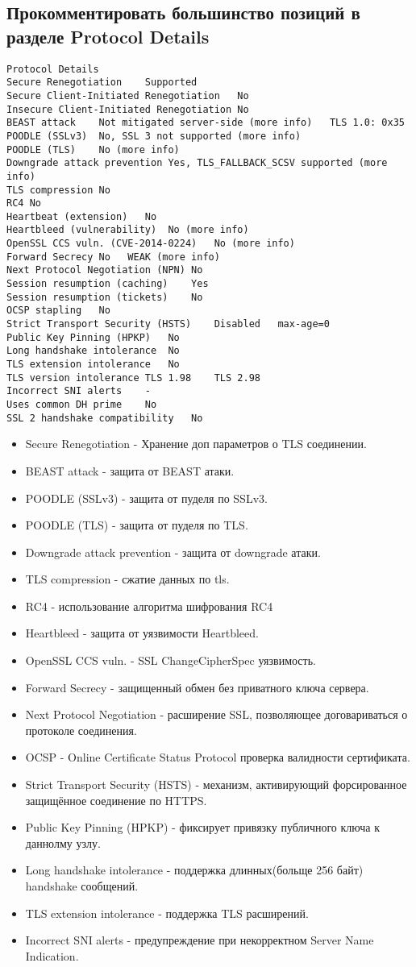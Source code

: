 \documentclass[12pt,a4paper]{article}
\begin{document}
\subsection{Прокомментировать большинство позиций в разделе Protocol Details}
\begin{verbatim}
Protocol Details
Secure Renegotiation	Supported
Secure Client-Initiated Renegotiation	No
Insecure Client-Initiated Renegotiation	No
BEAST attack	Not mitigated server-side (more info)   TLS 1.0: 0x35
POODLE (SSLv3)	No, SSL 3 not supported (more info)
POODLE (TLS)	No (more info)
Downgrade attack prevention	Yes, TLS_FALLBACK_SCSV supported (more info)
TLS compression	No
RC4	No
Heartbeat (extension)	No
Heartbleed (vulnerability)	No (more info)
OpenSSL CCS vuln. (CVE-2014-0224)	No (more info)
Forward Secrecy	No   WEAK (more info)
Next Protocol Negotiation (NPN)	No
Session resumption (caching)	Yes
Session resumption (tickets)	No
OCSP stapling	No
Strict Transport Security (HSTS)	Disabled   max-age=0
Public Key Pinning (HPKP)	No
Long handshake intolerance	No
TLS extension intolerance	No
TLS version intolerance	TLS 1.98 	TLS 2.98 
Incorrect SNI alerts	-
Uses common DH prime	No
SSL 2 handshake compatibility	No
\end{verbatim}
\begin{itemize}
\item Secure Renegotiation - Хранение доп параметров о TLS соединении.
\item BEAST attack - защита от BEAST атаки.
\item POODLE (SSLv3) - защита от пуделя по SSLv3.
\item POODLE (TLS) - защита от пуделя по TLS.
\item Downgrade attack prevention - защита от downgrade атаки.
\item TLS compression - сжатие данных по tls.
\item RC4 - использование алгоритма шифрования RC4
\item Heartbleed - защита от уязвимости Heartbleed.
\item OpenSSL CCS vuln. - SSL ChangeCipherSpec уязвимость.
\item Forward Secrecy - защищенный обмен без приватного ключа сервера.
\item Next Protocol Negotiation - расширение SSL, позволяющее договариваться о протоколе соединения.
\item OCSP - Online Certificate Status Protocol проверка валидности сертификата.
\item Strict Transport Security (HSTS) - механизм, активирующий форсированное защищённое соединение по HTTPS.
\item Public Key Pinning (HPKP) - фиксирует привязку публичного ключа к даннолму узлу.
\item Long handshake intolerance - поддержка длинных(больще 256 байт) handshake сообщений.
\item TLS extension intolerance - поддержка TLS расширений.
\item Incorrect SNI alerts - предупреждение при некорректном Server Name Indication.
\end{itemize}
\end{document}
